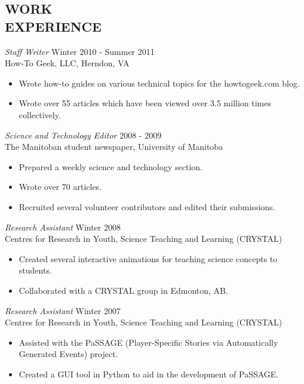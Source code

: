 \documentclass[line,margin]{res}
\begin{document}
\begin{resume}
\section{WORK \\EXPERIENCE}
  {\sl Staff Writer} \hfill Winter 2010 - Summer 2011 \\
  How-To Geek, LLC, Herndon, VA
  \begin{itemize}  \itemsep -2pt %
    \item Wrote how-to guides on various technical topics for the howtogeek.com blog.
    \item Wrote over 55 articles which have been viewed over 3.5 million times collectively.
  \end{itemize}
  
  {\sl Science and Technology Editor} \hfill 2008 - 2009 \\
  The Manitoban student newspaper, University of Manitoba
  \begin{itemize}  \itemsep -2pt %
    \item Prepared a weekly science and technology section.
    \item Wrote over 70 articles.
    \item Recruited several volunteer contributors and edited their submissions.
  \end{itemize}
  
  {\sl Research Assistant} \hfill Winter 2008 \\
  Centres for Research in Youth, Science Teaching and Learning (CRYSTAL)
  \begin{itemize}  \itemsep -2pt %
    \item Created several interactive animations for teaching science concepts to students.
    \item Collaborated with a CRYSTAL group in Edmonton, AB.
  \end{itemize}
  
  {\sl Research Assistant} \hfill Winter 2007 \\
  Centres for Research in Youth, Science Teaching and Learning (CRYSTAL)
  \begin{itemize}  \itemsep -2pt %
    \item Assisted with the PaSSAGE (Player-Specific Stories via Automatically Generated Events) project.
    \item Created a GUI tool in Python to aid in the development of PaSSAGE.
  \end{itemize}


\end{resume}
\end{document}

